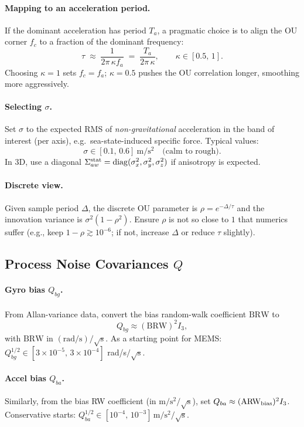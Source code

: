 \documentclass[10pt]{extarticle}
\begin{document}
\paragraph{Mapping to an acceleration period.}
If the dominant acceleration has period $T_a$, a pragmatic choice is to align the
OU corner $f_c$ to a fraction of the dominant frequency:
\begin{equation}
\tau \;\approx\; \frac{1}{2\pi\,\kappa f_a}
\;=\;
\frac{T_a}{2\pi\,\kappa},
\qquad
\kappa\in[0.5,\,1].
\label{eq:tau-map}
\end{equation}
Choosing $\kappa=1$ sets $f_c=f_a$; $\kappa=0.5$ pushes the OU correlation longer,
smoothing more aggressively.

\paragraph{Selecting $\sigma$.}
Set $\sigma$ to the expected RMS of \emph{non-gravitational} acceleration in the band of interest
(per axis), e.g.\ sea-state-induced specific force. Typical values:
\[
\sigma \in [0.1,\,0.6]\ \mathrm{m/s^2}\quad\text{(calm to rough)}.
\]
In 3D, use a diagonal $\Sigma_{aw}^{\rm stat}=\mathrm{diag}(\sigma_x^2,\sigma_y^2,\sigma_z^2)$
if anisotropy is expected.

\paragraph{Discrete view.}
Given sample period $\Delta$, the discrete OU parameter is $\rho=e^{-\Delta/\tau}$ and the
innovation variance is $\sigma^2(1-\rho^2)$. Ensure $\rho$ is not so close to $1$ that
numerics suffer (e.g., keep $1-\rho \gtrsim 10^{-6}$; if not, increase $\Delta$ or reduce $\tau$ slightly).

\subsection{Process Noise Covariances $Q$}
\paragraph{Gyro bias $Q_{bg}$.}
From Allan-variance data, convert the bias random-walk coefficient $\mathrm{BRW}$ to
\[
Q_{bg} \approx (\mathrm{BRW})^2 I_3,
\]
with $\mathrm{BRW}$ in $\mathrm{(rad/s)/\sqrt{s}}$. As a starting point for MEMS:
$Q_{bg}^{1/2}\in [3\!\times\!10^{-5},\,3\!\times\!10^{-4}]$ rad/s$/\sqrt{\mathrm{s}}$.

\paragraph{Accel bias $Q_{ba}$.}
Similarly, from the bias RW coefficient (in $\mathrm{m/s^2}/\sqrt{\mathrm{s}}$),
set $Q_{ba} \approx (\mathrm{ARW}_{\rm bias})^2 I_3$. Conservative starts:
$Q_{ba}^{1/2}\in [10^{-4},\,10^{-3}]\,\mathrm{m/s^2}/\sqrt{\mathrm{s}}$.
\end{document}
